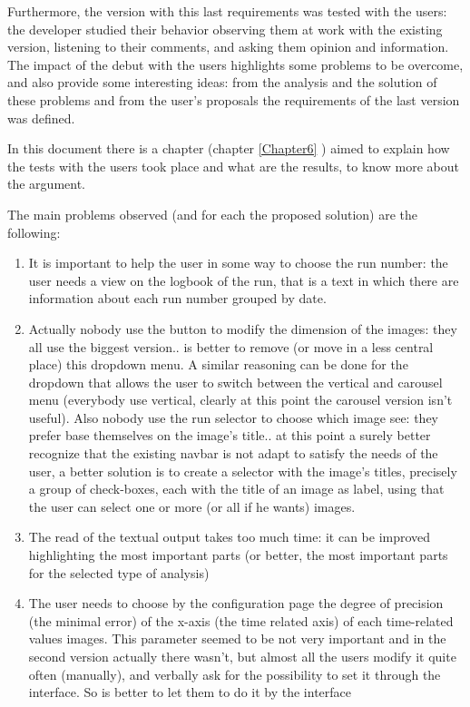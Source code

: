 Furthermore, the version with this last requirements was tested with the users: the developer studied their behavior observing them at work with the existing version, listening to their comments, and asking them opinion and information. The impact of the debut with the users highlights some problems to be overcome, and also provide some interesting ideas: from the analysis and the solution of these problems and from the user's proposals the requirements of the last version was defined. 

In this document there is a chapter (chapter \ref{Chapter6} ) aimed to explain how the tests with the users took place and what are the results, to know more about the argument.

The main problems observed (and for each the proposed solution) are the following:

\begin{enumerate}
\item 
It is important to help the user in some way to choose the run number: the user needs a view on the logbook of the run, that is a text in which there are information about each run number grouped by date.

\item
Actually nobody use the button to modify the dimension of the images: they all use the biggest version.. is better to remove (or move in a less central place) this dropdown menu. A similar reasoning can be done for the dropdown that allows the user to switch between the vertical and carousel menu (everybody use vertical, clearly at this point the carousel version isn't useful). Also nobody use the run selector to choose which image see: they prefer base themselves on the image's title.. at this point a surely better recognize that the existing navbar is not adapt to satisfy the needs of the user, a better solution is to create a selector with the image's titles, precisely a group of check-boxes, each with the title of an image as label, using that the user can select one or more (or all if he wants) images.  

\item
The read of the textual output takes too much time: it can be improved highlighting the most important parts (or better, the most important parts for the selected type of analysis)

\item
The user needs to choose by the configuration page the degree of precision (the minimal error) of the x-axis (the time related axis) of each time-related values images. This parameter seemed to be not very important and in the second version actually there wasn't, but almost all the users modify it quite often (manually), and verbally ask for the possibility to set it through the interface. So is better to let them to do it by the interface

\end{enumerate}

